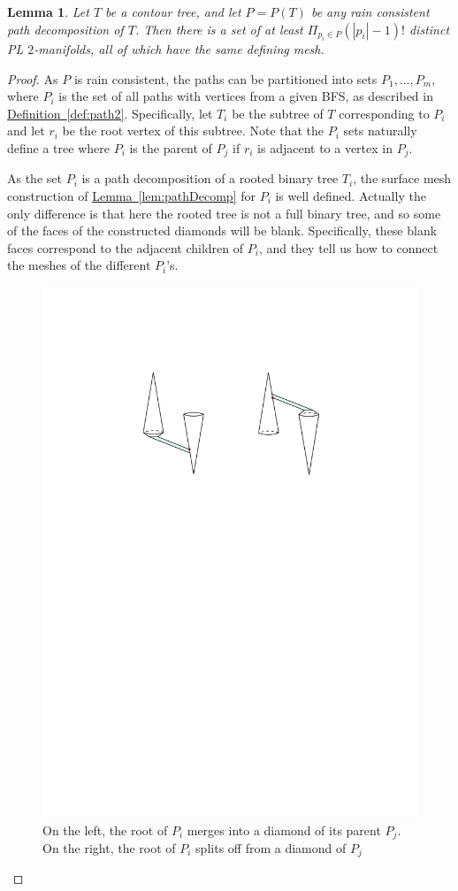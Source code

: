 \documentclass[11pt]{article}
\newtheorem{lemma}[theorem]{Lemma}
\theoremstyle{definition}
\newcommand{\Lem}[1]{\hyperref[lem:#1]{Lemma~\ref*{lem:#1}}} %
\newcommand{\Def}[1]{\hyperref[def:#1]{Definition~\ref*{def:#1}}} %
\begin{document}
\begin{lemma}
\label{lem:pathDecomp2}
Let $T$ be a contour tree, and let $P = P(T)$ be any rain consistent path decomposition of $T$.  
Then there is a set of at least $\Pi_{p_i\in P} (|p_i|-1)!$ distinct PL $2$-manifolds, all of which have the same defining mesh.
\end{lemma}
\begin{proof}
 As $P$ is rain consistent, the paths can be partitioned into sets $P_1, \dots, P_m$, where $P_i$ is the set of all paths with 
 vertices from a given BFS, as described in \Def{path2}.  Specifically, let $T_i$ be the subtree of $T$ corresponding to $P_i$ and 
 let $r_i$ be the root vertex of this subtree.  
 Note that the $P_i$ sets naturally define a tree where $P_i$ is the parent of $P_j$ if $r_i$ is adjacent to a vertex in $P_j$.  
 
 As the set $P_i$ is a path decomposition of a rooted binary tree $T_i$, the surface mesh construction of \Lem{pathDecomp} for $P_i$ is well defined.  
 Actually the only difference is that here the rooted tree is not a full binary tree, and so some of the faces of the constructed diamonds will be blank.  
 Specifically, these blank faces correspond to the adjacent children of $P_i$, and they tell us how to connect the meshes of the different $P_i$'s.
 
\begin{figure}[h]\centering
    \includegraphics[width=.5\linewidth]{figs/bridge2}
    \caption{On the left, the root of $P_i$ merges into a diamond of its parent $P_j$.  On the right, the root of $P_i$ splits off from a diamond of $P_j$}
    \label{fig:diamond}
\end{figure}
 

\end{proof}
\end{document}
